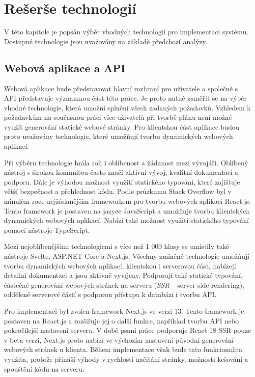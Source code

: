 \chapter{Rešerše technologií}

V této kapitole je popsán výběr vhodných technologií pro implementaci systému. Dostupné technologie jsou uvažovány na základě předchozí analýzy.

\section{Webová aplikace a API}

Webová aplikace bude představovat hlavní rozhraní pro uživatele a společně s API představuje významnou část této práce.
Je proto nutné zaměřit se na výběr vhodné technologie, která umožní splnění všech zadaných požadavků.
Vzhledem k požadavkům na současnou práci více uživatelů při tvorbě plánu není možné využít generování statické webové stránky. Pro klientskou část
aplikace budou proto uvažovány technologie, které umožňují tvorbu dynamických webových aplikací.

Při výběru technologie hrála roli i oblíbenost a žádanost mezi vývojáři. Oblíbený nástroj s širokou komunitou často značí aktivní vývoj, kvalitní dokumentaci
a podporu. Dále je výhodou možnost využití statického typování, které zajišťuje větší bezpečnost a přehlednost kódu. Podle průzkumu Stack Overflow \cite{so_dev_survey} 
byl v minulém roce nejžádanějším frameworkem pro tvorbu webových aplikací React.js. Tento framework je postaven na jazyce JavaScript a umožňuje tvorbu klientských
dynamických webových aplikací. Nabízí také možnost využití statického typování pomocí nástroje TypeScript.

Mezi nejoblíbenějšími technologiemi s více než 1 000 hlasy se umístily také nástroje Svelte, ASP.NET Core a Next.js. Všechny zmíněné technologie umožňují tvorbu dynamických webových aplikací,
klientskou i serverovou část, nabízejí detailní dokumentaci a jsou aktivně vyvíjeny. Podporují také statické typování, částečné generování webových stránek na serveru (\textit{SSR} -- server side rendering),
oddělené serverové částí s podporou přístupu k databázi i tvorbu API.

Pro implementaci byl zvolen framework Next.js ve verzi 13. Tento framework je postaven na React.js a rozšiřuje jej o další funkce, například tvorbu API nebo pokročilejší nastavení serveru.
V době psaní práce podporuje React 18 SSR pouze v beta verzi, Next.js proto nabízí ve výchozím nastavení původní generování webových stránek u klienta.
Během implementace však bude tato funkcionalita využita, protože přináší výhody v rychlosti načítání stránky, možnosti kešování a spouštění kódu na serveru.

